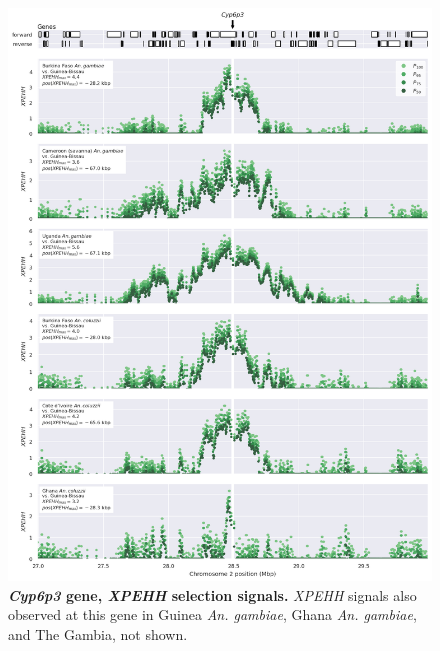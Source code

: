 \documentclass[a4paper,11pt,abstracton,hidelinks]{scrartcl}
\begin{document}
\begin{figure}[t!]
	\begin{center}
		\includegraphics*[width=1.1\linewidth,center]{artwork/locus_cyp6p3_xpehh.png}
	\end{center}
	\caption[\textit{Cyp6p3} gene, \textit{XPEHH} selection signals]{
	\textbf{\textit{Cyp6p3} gene, \textit{XPEHH} selection signals.}
	\textit{XPEHH} signals also observed at this gene in Guinea \textit{An. gambiae}, Ghana \textit{An. gambiae}, and The Gambia, not shown. 
	} 
	\label{fig:locus_cyp6p3_xpehh}
\end{figure}
\end{document}
